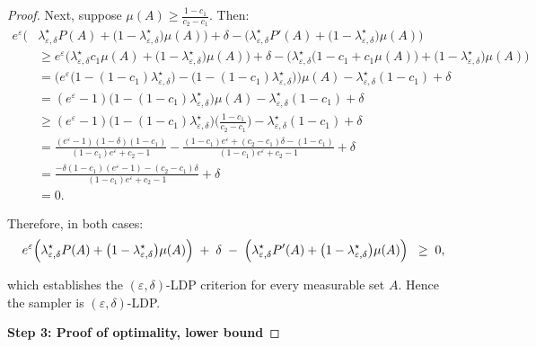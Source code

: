 \documentclass[accepted]{article}
\theoremstyle{plain} %
\theoremstyle{definition}
\theoremstyle{remark}
\begin{document}
\begin{proof}
Next, suppose \(\mu(A) \ge \frac{1 - c_1}{c_2 - c_1}\). Then:
\begin{align*}
e^{\varepsilon} \Big(&\lambda^\star_{\varepsilon,\delta}  P(A)  +  \big(1 - \lambda^\star_{\varepsilon,\delta}\big) \mu(A)\Big) + \delta - \Big(\lambda^\star_{\varepsilon,\delta} P'(A) + \big(1 - \lambda^\star_{\varepsilon,\delta}\big) \mu(A)\Big) \\ 
& \geq e^{\varepsilon} \Big(\lambda^\star_{\varepsilon,\delta} c_1 \mu(A) + \big(1 - \lambda^\star_{\varepsilon,\delta}\big) \mu(A)\Big) + \delta - \Big(\lambda^\star_{\varepsilon,\delta} \big(1 - c_1 + c_1 \mu(A)\big) + \big(1 - \lambda^\star_{\varepsilon,\delta}\big) \mu(A)\Big) \\
& = \Big(e^{\varepsilon} \big(1 - (1 - c_1) \lambda^\star_{\varepsilon,\delta}\big) - \big(1 - (1 - c_1) \lambda^\star_{\varepsilon,\delta}\big)\Big) \mu(A) - \lambda^\star_{\varepsilon,\delta}(1 - c_1) + \delta \\
& = (e^{\varepsilon} - 1)\big(1 - (1 - c_1) \lambda^\star_{\varepsilon,\delta}\big) \mu(A) - \lambda^\star_{\varepsilon,\delta}(1 - c_1) + \delta \\
& \geq (e^{\varepsilon} - 1)\big(1 - (1 - c_1) \lambda^\star_{\varepsilon,\delta}\big) \Big(\frac{1 - c_1}{c_2 - c_1}\Big) - \lambda^\star_{\varepsilon,\delta}(1 - c_1) + \delta \\
& = \frac{(e^{\varepsilon} - 1)(1 - \delta)(1 - c_1)}{(1 - c_1)e^{\varepsilon} + c_2 - 1} - \frac{(1 - c_1)e^{\varepsilon} + (c_2 - c_1)\delta - (1 - c_1)}{(1 - c_1)e^{\varepsilon} + c_2 - 1} + \delta \\
& = \frac{-\delta(1 - c_1)(e^{\varepsilon} - 1) - (c_2 - c_1)\delta}{(1 - c_1)e^{\varepsilon} + c_2 - 1} + \delta \\
& = 0.
\end{align*}

Therefore, in both cases:
\begin{align*}
e^\varepsilon \Bigl(\lambda^\star_{\varepsilon,\delta} P(A) 
   + \bigl(1 - \lambda^\star_{\varepsilon,\delta}\bigr)\mu(A)\Bigr)
\;+\;\delta
\;-\;
\Bigl(\lambda^\star_{\varepsilon,\delta} P'(A) 
   + \bigl(1 - \lambda^\star_{\varepsilon,\delta}\bigr)\mu(A)\Bigr)
\;\;\ge\;0,
\end{align*}


which establishes the \((\varepsilon,\delta)\)-LDP criterion for every measurable set \(A\). Hence the sampler is \((\varepsilon,\delta)\)-LDP.


    \textbf{Step 3: Proof of optimality, lower bound}


\end{proof}
\end{document}
